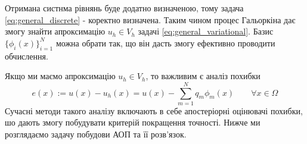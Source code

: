 Отримана систнма рівнянь буде додатно визначеною, тому задача \eqref{eq:general_discrete} - коректно  визначена\cite{OstShynAee11}. Таким чином процес Гальоркіна дає змогу знайти апроксимацію $u_h \in V_h$ задачі
\eqref{eq:general_variational}. Базис $\lbrace \phi_i(x)\rbrace_{i=1}^N$ можна обрати так, що він дасть змогу ефективно проводити обчислення.


Якщо ми маємо апроксимацію $u_h \in V_h$, то важливим є аналіз похибки
%
\begin{equation}
	e(x) := u(x) - u_h(x) = u(x) - \sum\limits_{m=1}^N q_m \phi_m (x) \qquad \forall x \in \Omega
\end{equation}
%
Сучасні методи такого аналізу включають в себе апостеріорні оцінювачі похибки, шо дають змогу побудувати критерій покращення точності.
Нижче ми розглядаємо задачу побудови АОП та її розв'язок.
